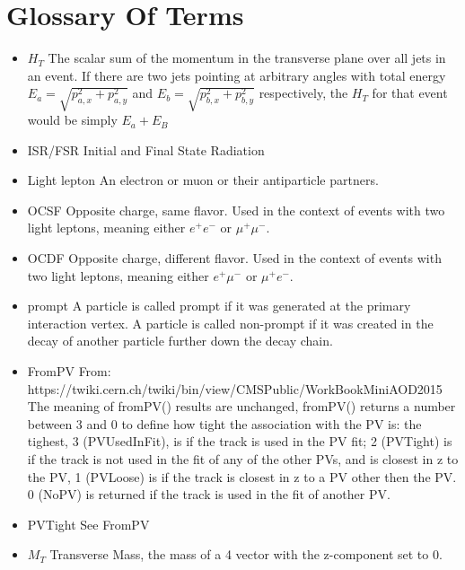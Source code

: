 \chapter{Glossary Of Terms} \label{ch:glossary}

\begin{itemize}
\item{$H_T$} The scalar sum of the momentum in the transverse plane over all jets in an event. If there are two jets pointing at arbitrary angles with total energy $E_a=\sqrt{p_{a,x}^2 + p_{a,y}^2}$ and $E_b=\sqrt{p_{b,x}^2 + p_{b,y}^2}$ respectively, the $H_T$ for that event would be simply $E_a + E_B$

\item{ISR/FSR} Initial and Final State Radiation

\item{Light lepton} An electron or muon or their antiparticle partners.

\item{OCSF} Opposite charge, same flavor. Used in the context of events with two light leptons, meaning either $e^+e^-$ or $\mu^+ \mu^-$.

\item{OCDF} Opposite charge, different flavor. Used in the context of events with two light leptons, meaning either $e^+\mu^-$ or $\mu^+ e^-$.

\item{prompt} A particle is called prompt if it was generated at the primary interaction vertex. A particle is called non-prompt if it was created in the decay of another particle further down the decay chain. 

\item{FromPV} From: https://twiki.cern.ch/twiki/bin/view/CMSPublic/WorkBookMiniAOD2015 The meaning of fromPV() results are unchanged, fromPV() returns a number between 3 and 0 to define how tight the association with the PV is: 
the tighest, 3 (PVUsedInFit), is if the track is used in the PV fit;
2 (PVTight) is if the track is not used in the fit of any of the other PVs, and is closest in z to the PV,
1 (PVLoose) is if the track is closest in z to a PV other then the PV.
0 (NoPV) is returned if the track is used in the fit of another PV.

\item{PVTight} See FromPV

\item{$M_T$} Transverse Mass, the mass of a 4 vector with the z-component set to 0.

\end{itemize}
